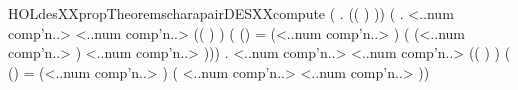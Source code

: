 \begin{SaveVerbatim}{HOLdesXXpropTheoremscharapairDESXXcompute}
\HOLTokenTurnstile{} (\HOLSymConst{\HOLTokenForall{}} .     \HOLSymConst{=} (( \HOLSymConst{\HOLTokenExtract{}} ) \HOLSymConst{,}  )) \HOLSymConst{\HOLTokenConj{}}
   (\HOLSymConst{\HOLTokenForall{}}  .
         <..num comp'n..> \HOLSymConst{=}
       <..num comp'n..> \HOLSymConst{=}  
        (( \HOLSymConst{\HOLTokenExtract{}} )  \HOLSymConst{\HOLTokenEor{}}   \HOLSymConst{,}  )
        (
           (\HOLSymConst{,}) =
                (<..num comp'n..> \HOLSymConst{\ensuremath{-}}  \HOLSymConst{\ensuremath{-}} )
           ( \HOLSymConst{\HOLTokenEor{}}  (<..num comp'n..> \HOLSymConst{\ensuremath{-}} ) \HOLSymConst{,}
             <..num comp'n..> ))) \HOLSymConst{\HOLTokenConj{}}
   \HOLSymConst{\HOLTokenForall{}}  .
        <..num comp'n..> \HOLSymConst{=}
      <..num comp'n..> \HOLSymConst{=}  
       (( \HOLSymConst{\HOLTokenExtract{}} )  \HOLSymConst{\HOLTokenEor{}}   \HOLSymConst{,}  )
       (
          (\HOLSymConst{,}) =    (<..num comp'n..> \HOLSymConst{\ensuremath{-}} )
          ( \HOLSymConst{\HOLTokenEor{}}  <..num comp'n..> \HOLSymConst{,} <..num comp'n..> ))
\end{SaveVerbatim}
\newcommand{\HOLdesXXpropTheoremscharapairDESXXcompute}{\UseVerbatim{HOLdesXXpropTheoremscharapairDESXXcompute}}
